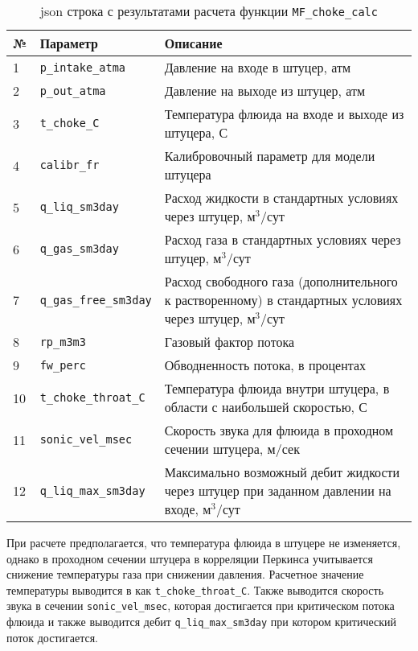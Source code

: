 \begin{table}[H]
	\caption{json строка с результатами расчета функции \texttt{MF_choke_calc} }
	\label{table:param_list_MF_choke_calc_json}
	\begin{tabular}{p{}p{}p{}}
		\hline
		№& Параметр & Описание  \\ \hline
		
		1 & \texttt{p_intake_atma} & Давление на входе в штуцер, атм    \\ \hline
		2 & \texttt{p_out_atma} & Давление на выходе из штуцер, атм    \\ \hline
		3 & \texttt{t_choke_C} & Температура флюида на входе и выходе из штуцера, С  \\ \hline
		4 & \texttt{calibr_fr} & Калибровочный параметр для модели штуцера  \\ \hline
		5 & \texttt{q_liq_sm3day} & Расход жидкости в стандартных условиях через штуцер, м$^3$/сут    \\ \hline
		6 & \texttt{q_gas_sm3day} & Расход газа в стандартных условиях через штуцер, м$^3$/сут    \\ \hline
		7 & \texttt{q_gas_free_sm3day} & Расход свободного газа (дополнительного к растворенному) в стандартных условиях через штуцер, м$^3$/сут    \\ \hline
		8 & \texttt{rp_m3m3} &  Газовый фактор потока  \\ \hline
		9 & \texttt{fw_perc} &  Обводненность потока, в процентах \\ \hline
		10 & \texttt{t_choke_throat_C} & Температура флюида внутри штуцера, в области с наибольшей скоростью, С  \\ \hline
		11 & \texttt{sonic_vel_msec} & Скорость звука для флюида в проходном сечении штуцера, м/сек  \\ \hline
		12 & \texttt{q_liq_max_sm3day} & Максимально возможный дебит жидкости через штуцер при заданном давлении на входе, м$^3$/сут  \\ \hline
		
	\end{tabular}
\end{table}
 
 При расчете предполагается, что температура флюида в штуцере не изменяется, однако в проходном сечении штуцера в корреляции Перкинса учитывается снижение температуры газа при снижении давления. Расчетное значение температуры выводится в как  \texttt{t_choke_throat_C}. Также выводится скорость звука в сечении \texttt{sonic_vel_msec}, которая достигается при критическом потока флюида и также выводится дебит \texttt{q_liq_max_sm3day} при котором критический поток достигается. 
 
